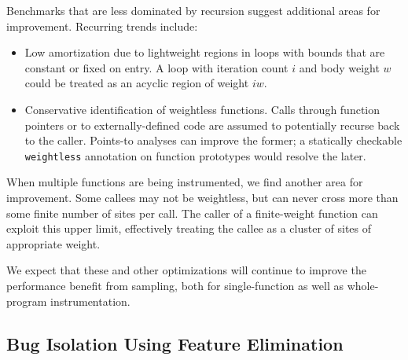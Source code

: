 Benchmarks that are less dominated by recursion suggest additional
areas for improvement.  Recurring trends include:

\begin{itemize}
\item Low amortization due to lightweight regions in loops with bounds
  that are constant or fixed on entry.  A loop with iteration count
  $i$ and body weight $w$ could be treated as an acyclic region of
  weight $iw$.

\item Conservative identification of weightless functions.  Calls
  through function pointers or to externally-defined code are assumed
  to potentially recurse back to the caller.  Points-to analyses can
  improve the former; a statically checkable \texttt{weightless}
  annotation on function prototypes would resolve the later.
\end{itemize}

When multiple functions are being instrumented, we find another area
for improvement.  Some callees may not be weightless, but can never
cross more than some finite number of sites per call.  The caller of a
finite-weight function can exploit this upper limit, effectively
treating the callee as a cluster of sites of appropriate weight.

We expect that these and other optimizations will continue to improve
the performance benefit from sampling, both for single-function as
well as whole-program instrumentation.

\subsection{Bug Isolation Using Feature Elimination}
\label{sec:ccrypt}





